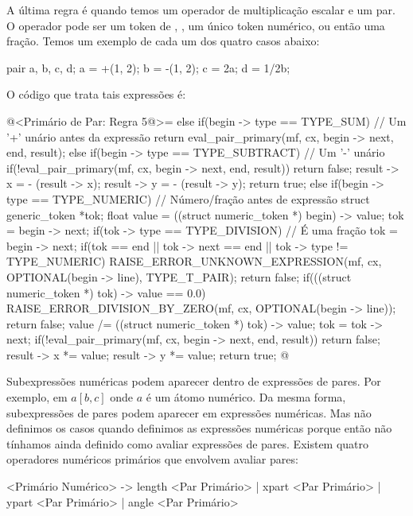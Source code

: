 A última regra é quando temos um operador de multiplicação escalar e
um par. O operador pode ser um token
de \monoespaco{+}, \monoespaco{-}, um único token numérico, ou então
uma fração. Temos um exemplo de cada um dos quatro casos abaixo:

\alinhaverbatim
pair a, b, c, d;
a = +(1, 2);
b = -(1, 2);
c = 2a;
d = 1/2b;
\alinhanormal

O código que trata tais expressões é:

\iniciocodigo
@<Primário de Par: Regra 5@>=
else{
  if(begin -> type == TYPE_SUM) // Um '+' unário antes da expressão
    return eval_pair_primary(mf, cx, begin -> next, end, result);
  else if(begin -> type == TYPE_SUBTRACT){ // Um '-' unário
    if(!eval_pair_primary(mf, cx, begin -> next, end, result))
      return false;
    result -> x = - (result -> x);
    result -> y = - (result -> y);
    return true;
  }
  else if(begin -> type == TYPE_NUMERIC){ // Número/fração antes de expressão
    struct generic_token *tok;
    float value = ((struct numeric_token *) begin) -> value;
    tok = begin -> next;
    if(tok -> type == TYPE_DIVISION){ // É uma fração
      tok = begin -> next;
      if(tok == end || tok -> next == end || tok -> type != TYPE_NUMERIC){
        RAISE_ERROR_UNKNOWN_EXPRESSION(mf, cx, OPTIONAL(begin -> line),
                                       TYPE_T_PAIR);
        return false;
      }
      if(((struct numeric_token *) tok) -> value == 0.0){
        RAISE_ERROR_DIVISION_BY_ZERO(mf, cx, OPTIONAL(begin -> line));
        return false;
      }
      value /= ((struct numeric_token *) tok) -> value;
      tok = tok -> next;
    }
    if(!eval_pair_primary(mf, cx, begin -> next, end, result))
      return false;
    result -> x *= value;
    result -> y *= value;
    return true;
  }
}
@
\fimcodigo


Subexpressões numéricas podem aparecer dentro de expressões de
pares. Por exemplo, em $a[b,c]$ onde $a$ é um átomo numérico. Da mesma
forma, subexpressões de pares podem aparecer em expressões
numéricas. Mas não definimos os casos quando definimos as expressões
numéricas porque então não tínhamos ainda definido como avaliar
expressões de pares. Existem quatro operadores numéricos primários que
envolvem avaliar pares:

\alinhaverbatim
<Primário Numérico> -> length <Par Primário> | xpart <Par Primário> |
                       ypart <Par Primário> | angle <Par Primário>
\alinhanormal

